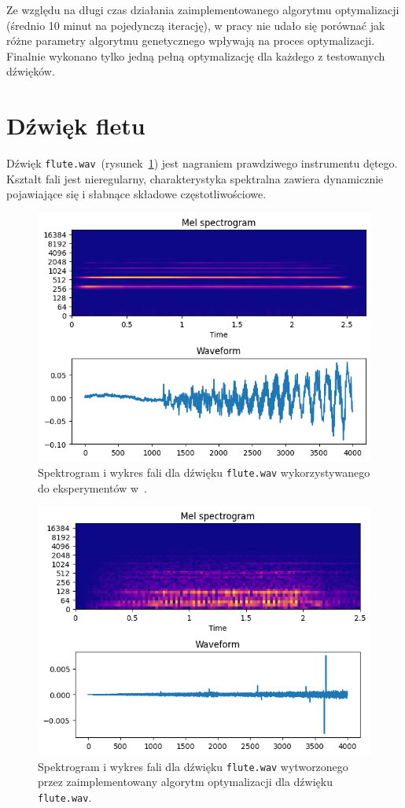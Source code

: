 Ze względu na długi czas działania zaimplementowanego algorytmu optymalizacji
(średnio 10 minut na pojedynczą iterację),
w pracy nie udało się porównać jak różne parametry algorytmu genetycznego
wpływają na proces optymalizacji. Finalnie wykonano tylko jedną pełną optymalizację
dla każdego z testowanych dźwięków.

\newpage

\section{Dźwięk fletu}

Dźwięk \texttt{flute.wav}~(rysunek~\ref{fig:literature_flute_sound_overview})
jest nagraniem prawdziwego instrumentu dętego. Kształt fali jest nieregularny,
charakterystyka spektralna zawiera dynamicznie pojawiające się i słabnące 
składowe częstotliwościowe.

\begin{figure}[H]
    \centering
    \includegraphics[width=0.7\linewidth]{rys06/target_sample_flute_literature.png}
    \caption{
      Spektrogram i wykres fali dla dźwięku \texttt{flute.wav} wykorzystywanego
      do eksperymentów w~\cite{evolutionary_puredata_results}.
    }\label{fig:literature_flute_sound_overview}
\end{figure}

\begin{figure}[H]
    \centering
    \includegraphics[width=0.7\linewidth]{rys06/evolved_sample_flute.png}
    \caption{
      Spektrogram i wykres fali dla dźwięku \texttt{flute.wav}
      wytworzonego przez zaimplementowany algorytm optymalizacji
      dla dźwięku \texttt{flute.wav}.
    }\label{fig:evolved_flute_sound_overview}
\end{figure}


